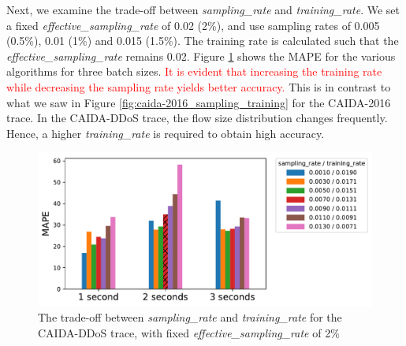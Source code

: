 		Next, we examine the trade-off between \emph{sampling\_rate} and \emph{training\_rate}. We set a fixed \emph{effective\_sampling\_rate} of 0.02 (2\%), and use sampling rates of 0.005 (0.5\%), 0.01 (1\%) and 0.015 (1.5\%). The training rate is calculated such that the \emph{effective\_sampling\_rate} remains 0.02. Figure \ref{fig:caida-ddos_sampling_training} shows the MAPE for the various algorithms for three batch sizes. \textcolor{red}{It is evident that increasing the training rate while decreasing the sampling rate yields better accuracy.} This is in contrast to what we saw in Figure \ref{fig:caida-2016_sampling_training} for the CAIDA-2016 trace. In the CAIDA-DDoS trace, the flow size distribution changes frequently. Hence, a higher \emph{training\_rate} is required to obtain high accuracy.
		\begin{figure}[!t]
			\centering
			\includegraphics[width=.49\textwidth]{img/caida-ddos_tradeoff_new.pdf}
			\caption{The trade-off between \emph{sampling\_rate} and \emph{training\_rate} for the CAIDA-DDoS trace, with fixed \emph{effective\_sampling\_rate} of 2\%}
			\label{fig:caida-ddos_sampling_training}
		\end{figure}

